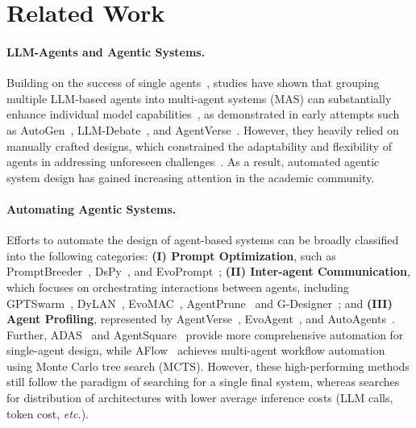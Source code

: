 \section{Related Work}
\vspace{-0.3em}
\paragraph{LLM-Agents and Agentic Systems.}
Building on the success of single agents~\citep{shen2024hugginggpt,zhu2024knowagent,zhong2024memorybank}, studies have shown that grouping multiple LLM-based agents into multi-agent systems (MAS) can substantially enhance individual model capabilities~\citep{FCS2024_Survey-Agent}, as demonstrated in early attempts such as AutoGen~\citep{autogen}, LLM-Debate~\citep{arXiv2023_MultiAgent-Debate}, and AgentVerse~\citep{chen2023agentverse}. 
However, they heavily relied on manually crafted designs, which constrained the adaptability and flexibility of agents in addressing unforeseen challenges~\citep{he2023lego,chen2023agentverse}. As a result, automated agentic system design has gained increasing attention in the academic community.




\vspace{-0.6em}
\paragraph{Automating Agentic Systems.}
Efforts to automate the design of agent-based systems can be broadly classified into the following categories: \textbf{(I) Prompt Optimization}, such as PromptBreeder~\citep{fernando2023promptbreeder}, DsPy~\citep{khattab2023dspy}, and EvoPrompt~\citep{guo2023evoprompt}; \textbf{(II) Inter-agent Communication}, which focuses on orchestrating interactions between agents, including GPTSwarm~\citep{zhuge2024gptswarm}, DyLAN~\citep{arXiv2023_Dynamic-LLM-Agent}, EvoMAC~\citep{hu2024evomac}, AgentPrune~\citep{zhang2024cut} and G-Designer~\citep{zhang2024gdesigner}; and \textbf{(III) Agent Profiling}, represented by AgentVerse~\citep{chen2023agentverse}, EvoAgent~\citep{yuan2024evoagent}, and AutoAgents~\citep{chen2023autoagents}. 
Further, ADAS~\citep{hu2024adas} and AgentSquare~\citep{shang2024agentsquare} provide more comprehensive automation for single-agent design, while AFlow~\citep{zhang2024aflow} achieves multi-agent workflow automation using Monte Carlo tree search (MCTS). However, these high-performing methods still follow the paradigm of searching for a single final system, whereas \ourmethod searches for distribution of architectures with lower average inference costs (LLM calls, token cost, \textit{etc.}).


